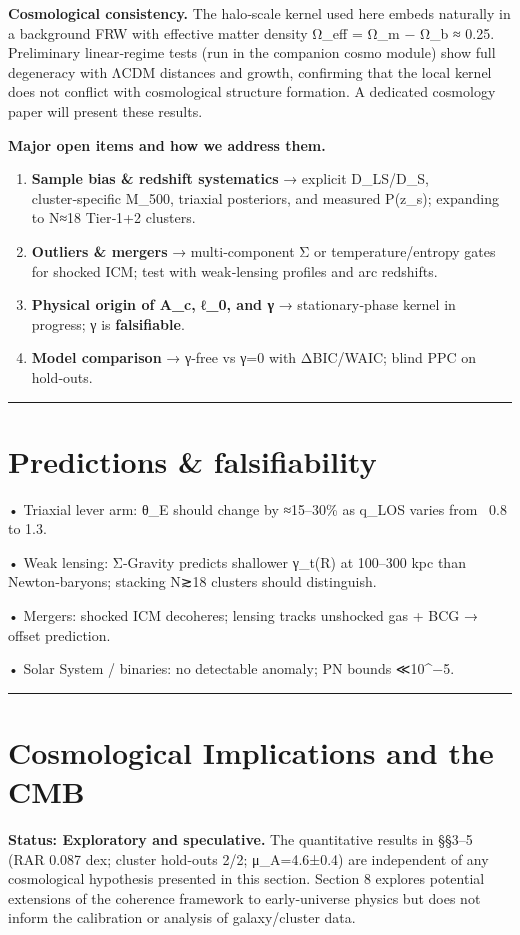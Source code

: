 \documentclass[11pt,a4paper]{article}
\begin{document}
\textbf{Cosmological consistency.} The halo‑scale kernel used here embeds naturally in a background FRW with effective matter density Ω\_eff = Ω\_m − Ω\_b ≈ 0.25. Preliminary linear‑regime tests (run in the companion cosmo module) show full degeneracy with ΛCDM distances and growth, confirming that the local kernel does not conflict with cosmological structure formation. A dedicated cosmology paper will present these results.


\textbf{Major open items and how we address them.}

\begin{enumerate}
\item \textbf{Sample bias \& redshift systematics} → explicit D\_LS/D\_S, cluster‑specific M\_500, triaxial posteriors, and measured P(z\_s); expanding to N≈18 Tier‑1+2 clusters.
\item \textbf{Outliers \& mergers} → multi‑component Σ or temperature/entropy gates for shocked ICM; test with weak‑lensing profiles and arc redshifts.
\item \textbf{Physical origin of A\_c, ℓ\_0, and γ} → stationary‑phase kernel in progress; γ is \textbf{falsifiable}.
\item \textbf{Model comparison} → γ‑free vs γ=0 with ΔBIC/WAIC; blind PPC on hold‑outs.
\end{enumerate}


\medskip\hrule\medskip


\section{Predictions \& falsifiability}


• Triaxial lever arm: θ\_E should change by ≈15–30\% as q\_LOS varies from ~0.8 to 1.3.  

• Weak lensing: Σ‑Gravity predicts shallower γ\_t(R) at 100–300 kpc than Newton‑baryons; stacking N≳18 clusters should distinguish.  

• Mergers: shocked ICM decoheres; lensing tracks unshocked gas + BCG → offset prediction.  

• Solar System / binaries: no detectable anomaly; PN bounds ≪10^−5.


\medskip\hrule\medskip


\section{Cosmological Implications and the CMB}


\textbf{Status: Exploratory and speculative.} The quantitative results in §§3–5 (RAR 0.087 dex; cluster hold-outs 2/2; μ\_A=4.6±0.4) are independent of any cosmological hypothesis presented in this section. Section 8 explores potential extensions of the coherence framework to early‑universe physics but does not inform the calibration or analysis of galaxy/cluster data.
\end{document}

